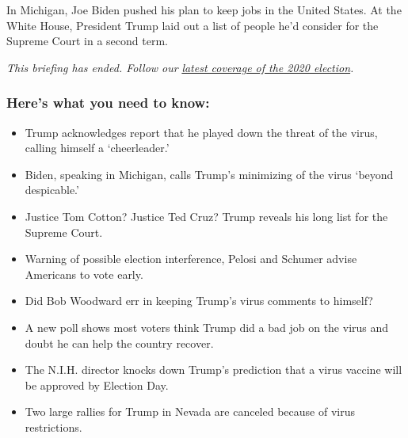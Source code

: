 In Michigan, Joe Biden pushed his plan to keep jobs in the United
States. At the White House, President Trump laid out a list of people
he'd consider for the Supreme Court in a second term.

\emph{This briefing has ended. Follow our}
\href{https://www.nytimes3xbfgragh.onion/live/2020/09/10/us/trump-vs-biden}{\emph{latest
coverage of the 2020 election}}\emph{.}

\hypertarget{heres-what-you-need-to-know}{%
\subsubsection{Here's what you need to
know:}\label{heres-what-you-need-to-know}}

\begin{itemize}
\item
  \protect\hyperlink{trump-acknowledges-report-that-he-played-down-the-threat-of-the-virus-calling-himself-a-cheerleader}{}

  Trump acknowledges report that he played down the threat of the virus,
  calling himself a `cheerleader.'
\item
  \protect\hyperlink{biden-speaking-in-michigan-calls-trumps-minimizing-of-the-virus-beyond-despicable}{}

  Biden, speaking in Michigan, calls Trump's minimizing of the virus
  `beyond despicable.'
\item
  \protect\hyperlink{justice-tom-cotton-justice-ted-cruz-trump-reveals-his-long-list-for-the-supreme-court}{}

  Justice Tom Cotton? Justice Ted Cruz? Trump reveals his long list for
  the Supreme Court.
\item
  \protect\hyperlink{warning-of-possible-election-interference-pelosi-and-schumer-advise-americans-to-vote-early}{}

  Warning of possible election interference, Pelosi and Schumer advise
  Americans to vote early.
\item
  \protect\hyperlink{did-bob-woodward-err-in-keeping-trumps-virus-comments-to-himself}{}

  Did Bob Woodward err in keeping Trump's virus comments to himself?
\item
  \protect\hyperlink{a-new-poll-shows-most-voters-think-trump-did-a-bad-job-on-the-virus-and-doubt-he-can-help-the-country-recover}{}

  A new poll shows most voters think Trump did a bad job on the virus
  and doubt he can help the country recover.
\item
  \protect\hyperlink{the-nih-director-knocks-down-trumps-prediction-that-a-virus-vaccine-will-be-approved-by-election-day}{}

  The N.I.H. director knocks down Trump's prediction that a virus
  vaccine will be approved by Election Day.
\item
  \protect\hyperlink{two-large-rallies-for-trump-in-nevada-are-canceled-because-of-virus-restrictions}{}

  Two large rallies for Trump in Nevada are canceled because of virus
  restrictions.
\end{itemize}

